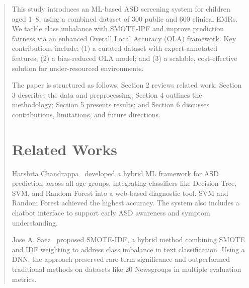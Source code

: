 \documentclass[runningheads]{llncs}
\begin{document}
\begin{abstract}
This study introduces an ML-based ASD screening system for children aged 1–8, using a combined dataset of 300 public and 600 clinical EMRs. We tackle class imbalance with SMOTE-IPF and improve prediction fairness via an enhanced Overall Local Accuracy (OLA) framework. Key contributions include: (1) a curated dataset with expert-annotated features; (2) a bias-reduced OLA model; and (3) a scalable, cost-effective solution for under-resourced environments.

The paper is structured as follows: Section 2 reviews related work; Section 3 describes the data and preprocessing; Section 4 outlines the methodology; Section 5 presents results; and Section 6 discusses contributions, limitations, and future directions.

\section{Related Works}

Harshita Chandrappa~\cite{b5} developed a hybrid ML framework for ASD prediction across all age groups, integrating classifiers like Decision Tree, SVM, and Random Forest into a web-based diagnostic tool. SVM and Random Forest achieved the highest accuracy. The system also includes a chatbot interface to support early ASD awareness and symptom understanding.

Jose A. Saez~\cite{b6} proposed SMOTE-IDF, a hybrid method combining SMOTE and IDF weighting to address class imbalance in text classification. Using a DNN, the approach preserved rare term significance and outperformed traditional methods on datasets like 20 Newsgroups in multiple evaluation metrics.



\end{abstract}
\end{document}
